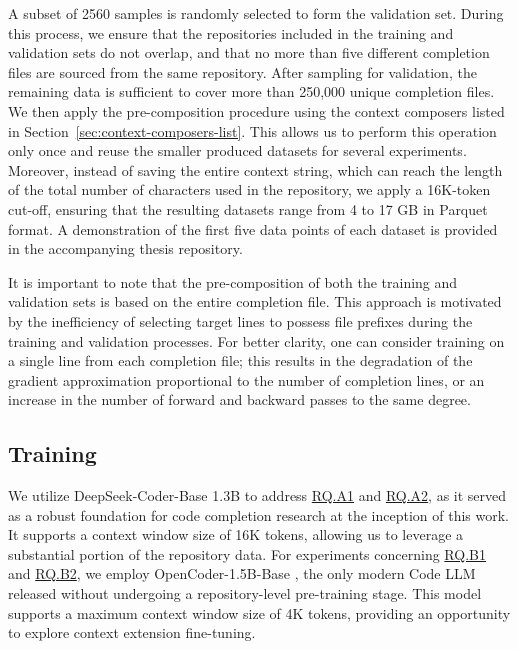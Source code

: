 A subset of 2560 samples is randomly selected to form the validation set. During this process, we ensure that the repositories included in the training and validation sets do not overlap, and that no more than five different completion files are sourced from the same repository. After sampling for validation, the remaining data is sufficient to cover more than 250,000 unique completion files. We then apply the pre-composition procedure using the context composers listed in Section~\ref{sec:context-composers-list}. This allows us to perform this operation only once and reuse the smaller produced datasets for several experiments. Moreover, instead of saving the entire context string, which can reach the length of the total number of characters used in the repository, we apply a 16K-token cut-off, ensuring that the resulting datasets range from 4 to 17 GB in Parquet format. A demonstration of the first five data points of each dataset is provided in the accompanying thesis repository.

It is important to note that the pre-composition of both the training and validation sets is based on the entire completion file. This approach is motivated by the inefficiency of selecting target lines to possess file prefixes during the training and validation processes. For better clarity, one can consider training on a single line from each completion file; this results in the degradation of the gradient approximation proportional to the number of completion lines, or an increase in the number of forward and backward passes to the same degree.

\subsection{Training}

We utilize DeepSeek-Coder-Base 1.3B \parencite{guo2024} to address \hyperref[rq:rq-a1]{RQ.A1} and \hyperref[rq:rq-a2]{RQ.A2}, as it served as a robust foundation for code completion research at the inception of this work. It supports a context window size of 16K tokens, allowing us to leverage a substantial portion of the repository data. For experiments concerning \hyperref[rq:rq-b1]{RQ.B1} and \hyperref[rq:rq-b2]{RQ.B2}, we employ OpenCoder-1.5B-Base \parencite{huang2024}, the only modern Code LLM released without undergoing a repository-level pre-training stage. This model supports a maximum context window size of 4K tokens, providing an opportunity to explore context extension fine-tuning.

